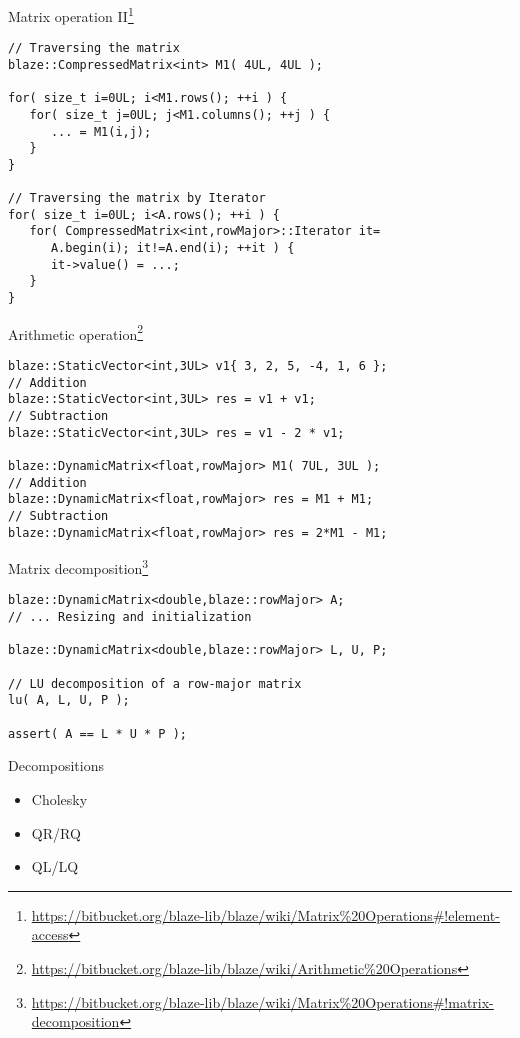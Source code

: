 \documentclass[\classoption]{beamer}
\begin{document}
\begin{frame}[fragile]{Matrix operation II\footnote{\tiny\url{https://bitbucket.org/blaze-lib/blaze/wiki/Matrix\%20Operations\#!element-access}}}
\begin{lstlisting}
// Traversing the matrix 
blaze::CompressedMatrix<int> M1( 4UL, 4UL );

for( size_t i=0UL; i<M1.rows(); ++i ) {
   for( size_t j=0UL; j<M1.columns(); ++j ) {
      ... = M1(i,j);
   }
}

// Traversing the matrix by Iterator
for( size_t i=0UL; i<A.rows(); ++i ) {
   for( CompressedMatrix<int,rowMajor>::Iterator it=
      A.begin(i); it!=A.end(i); ++it ) {
      it->value() = ...;  
   }
}
\end{lstlisting}
\end{frame}

\begin{frame}[fragile]{Arithmetic operation\footnote{\tiny\url{https://bitbucket.org/blaze-lib/blaze/wiki/Arithmetic\%20Operations}}}
\begin{lstlisting}
blaze::StaticVector<int,3UL> v1{ 3, 2, 5, -4, 1, 6 };
// Addition
blaze::StaticVector<int,3UL> res = v1 + v1;
// Subtraction
blaze::StaticVector<int,3UL> res = v1 - 2 * v1;

blaze::DynamicMatrix<float,rowMajor> M1( 7UL, 3UL );
// Addition
blaze::DynamicMatrix<float,rowMajor> res = M1 + M1;
// Subtraction
blaze::DynamicMatrix<float,rowMajor> res = 2*M1 - M1;
\end{lstlisting}
\end{frame}



\begin{frame}[fragile]{Matrix decomposition\footnote{\tiny\url{https://bitbucket.org/blaze-lib/blaze/wiki/Matrix\%20Operations\#!matrix-decomposition}}}
\begin{lstlisting}
blaze::DynamicMatrix<double,blaze::rowMajor> A;
// ... Resizing and initialization

blaze::DynamicMatrix<double,blaze::rowMajor> L, U, P;

// LU decomposition of a row-major matrix
lu( A, L, U, P );  

assert( A == L * U * P );
\end{lstlisting}

\begin{block}{Decompositions}
\begin{itemize}
\item Cholesky 
\item QR/RQ
\item QL/LQ
\end{itemize}
\end{block}

\end{frame}
\end{document}
